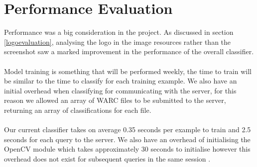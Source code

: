 \documentclass[12pt,twoside]{report}
\begin{document}
\section{Performance Evaluation}
Performance was a big consideration in the project. As discussed in section \ref{logoevaluation}, analysing the logo in the image resources rather than the screenshot saw a marked improvement in the performance of the overall classifier. 
\\\\
Model training is something that will be performed weekly, the time to train will be similar to the time to classify for each training example. We also have an initial overhead when classifying for communicating with the server, for this reason we allowed an array of WARC files to be submitted to the server, returning an array of classifications for each file.
\\\\
Our current classifier takes on average 0.35 seconds per example to train and 2.5 seconds for each query to the server. We also have an overhead of initialising the OpenCV module which takes approximately 30 seconds to initialise however this overhead does not exist for subsequent queries in the same session \cite{opencv}.
\end{document}

